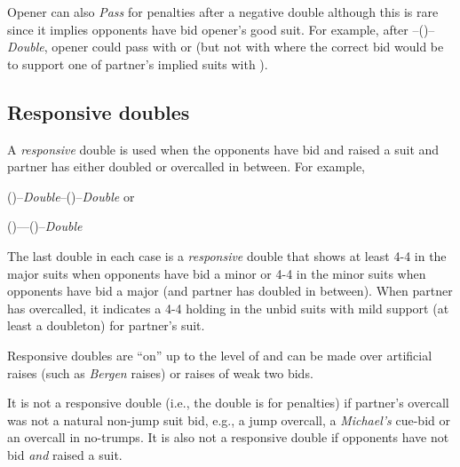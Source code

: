 \documentclass[a4paper,article,oneside]{memoir}
\begin{document}
Opener can also \emph{Pass} for penalties after a negative double
although this is rare since it implies opponents have bid opener's
good suit. For example, after --()--\emph{Double}, opener
could pass with  or 
(but not with  where the correct bid would be
to support one of partner's implied suits with ).

\subsection{Responsive doubles}

A \emph{responsive} double is used when the opponents have bid and
raised a suit and partner has either doubled or overcalled in
between. For example,

()--\emph{Double}--()--\emph{Double} or

()----()--\emph{Double}

The last double in each case is a \emph{responsive} double that shows
at least 4-4 in the major suits when opponents have bid a minor or 4-4
in the minor suits when opponents have bid a major (and partner has
doubled in between). When partner has overcalled, it indicates a 4-4
holding in the unbid suits with mild support (at least a doubleton)
for partner's suit.

Responsive doubles are ``on'' up to the level of  and can be
made over artificial raises (such as \emph{Bergen} raises) or raises
of weak two bids.

It is not a responsive double (i.e., the double is for penalties) if
partner's overcall was not a natural non-jump suit bid, e.g., a jump
overcall, a \emph{Michael's} cue-bid or an overcall in no-trumps. It
is also not a responsive double if opponents have not bid \emph{and}
raised a suit.
\end{document}
